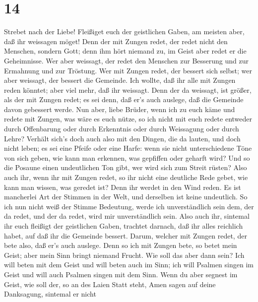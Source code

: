 \hypertarget{section-13}{%
\section{14}\label{section-13}}

 Strebet nach der Liebe! Fleißiget euch der geistlichen
Gaben, am meisten aber, daß ihr weissagen möget!  Denn der
mit Zungen redet, der redet nicht den Menschen, sondern Gott; denn ihm
hört niemand zu, im Geist aber redet er die Geheimnisse. 
Wer aber weissagt, der redet den Menschen zur Besserung und zur
Ermahnung und zur Tröstung.  Wer mit Zungen redet, der
bessert sich selbst; wer aber weissagt, der bessert die Gemeinde.
 Ich wollte, daß ihr alle mit Zungen reden könntet; aber
viel mehr, daß ihr weissagt. Denn der da weissagt, ist größer, als der
mit Zungen redet; es sei denn, daß er's auch auslege, daß die Gemeinde
davon gebessert werde.  Nun aber, liebe Brüder, wenn ich zu
euch käme und redete mit Zungen, was wäre es euch nütze, so ich nicht
mit euch redete entweder durch Offenbarung oder durch Erkenntnis oder
durch Weissagung oder durch Lehre?  Verhält sich's doch auch
also mit den Dingen, die da lauten, und doch nicht leben; es sei eine
Pfeife oder eine Harfe: wenn sie nicht unterschiedene Töne von sich
geben, wie kann man erkennen, was gepfiffen oder geharft wird?
 Und so die Posaune einen undeutlichen Ton gibt, wer wird
sich zum Streit rüsten?  Also auch ihr, wenn ihr mit Zungen
redet, so ihr nicht eine deutliche Rede gebet, wie kann man wissen, was
geredet ist? Denn ihr werdet in den Wind reden.  Es ist
mancherlei Art der Stimmen in der Welt, und derselben ist keine
undeutlich.  So ich nun nicht weiß der Stimme Bedeutung,
werde ich unverständlich sein dem, der da redet, und der da redet, wird
mir unverständlich sein.  Also auch ihr, sintemal ihr euch
fleißigt der geistlichen Gaben, trachtet darnach, daß ihr alles
reichlich habet, auf daß ihr die Gemeinde bessert.  Darum,
welcher mit Zungen redet, der bete also, daß er's auch auslege.
 Denn so ich mit Zungen bete, so betet mein Geist; aber
mein Sinn bringt niemand Frucht.  Wie soll das aber dann
sein? Ich will beten mit dem Geist und will beten auch im Sinn; ich will
Psalmen singen im Geist und will auch Psalmen singen mit dem Sinn.
 Wenn du aber segnest im Geist, wie soll der, so an des
Laien Statt steht, Amen sagen auf deine Danksagung, sintemal er nicht
